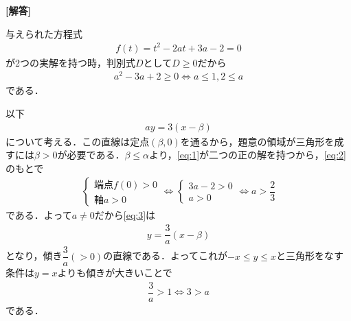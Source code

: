 \documentclass[../../main.tex]{subfiles}
\begin{document}
\begin{oframed}
  
\end{oframed}

{\bf [解答]}

与えられた方程式
\begin{align}
  f(t) = t^2-2at+3a-2 = 0 \label{eq:1}
\end{align}
が2つの実解を持つ時，判別式$D$として$D \ge 0$だから
\begin{align}
  a^2 - 3a + 2 \ge 0 \iff a \le 1, 2 \le a \label{eq:2}
\end{align}
である．

以下
\begin{align}
  ay = 3(x-\beta) \label{eq:3}
\end{align}
について考える．この直線は定点$(\beta,0)$を通るから，題意の領域が三角形を成すには$\beta>0$が必要である．$\beta \le \alpha$より，\cref{eq:1}が二つの正の解を持つから，\cref{eq:2}のもとで
\begin{align}
  \begin{cases}
    \text{端点} f(0) > 0 \\
    \text{軸}  a > 0
  \end{cases}
  \iff
  \begin{cases}
    3a-2 > 0
    \\ a > 0
  \end{cases}
  \iff a > \dfrac{2}{3} \label{eq:4}
\end{align}
である．よって$a \neq 0$だから\cref{eq:3}は
\begin{align}
  y = \dfrac{3}{a}(x-\beta)
\end{align}
となり，傾き$\dfrac{3}{a} (>0)$の直線である．よってこれが$-x \le y \le x$と三角形をなす条件は$y=x$よりも傾きが大きいことで
\begin{align}
  \dfrac{3}{a} > 1 \iff 3 > a \label{eq:5}
\end{align}
である．
\end{document}
